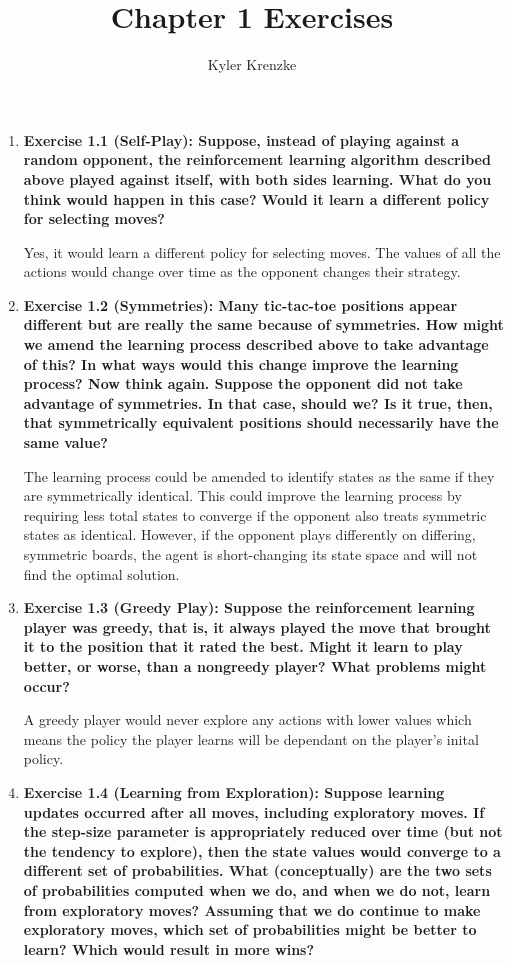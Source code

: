 \documentclass{article}
\title{Chapter 1 Exercises}
\author{Kyler Krenzke}
\date{}
\begin{document}
	
	\maketitle
	
	\begin{enumerate}

		\item \textbf{Exercise 1.1 (Self-Play): Suppose, instead of playing against a random opponent, the reinforcement learning algorithm described above played against itself,
		with both sides learning. What do you think would happen in this case? Would it learn a different policy for selecting moves?}
		
		Yes, it would learn a different policy for selecting moves. The values of all the actions would change over time as
		the opponent changes their strategy.

		\item \textbf{Exercise 1.2 (Symmetries): Many tic-tac-toe positions appear different but are really the same because of symmetries. How might we amend the learning process
		described above to take advantage of this? In what ways would this change improve the learning process? Now think again. Suppose the opponent did not take advantage of
		symmetries. In that case, should we? Is it true, then, that symmetrically equivalent positions should necessarily have the same value?}
		
		The learning process could be amended to identify states as the same if they are symmetrically identical. This could improve the learning process by requiring less total
		states to converge if the opponent also treats symmetric states as identical. However, if the opponent plays differently on differing, symmetric boards, the agent is
		short-changing its state space and will not find the optimal solution.

		\item \textbf{Exercise 1.3 (Greedy Play): Suppose the reinforcement learning player was greedy, that is, it always played the move that brought it to the position that it
		rated the best. Might it learn to play better, or worse, than a nongreedy player? What problems might occur?}
		
		A greedy player would never explore any actions with lower values which means the policy the player learns will be
		dependant on the player's inital policy. 

		\item \textbf{Exercise 1.4 (Learning from Exploration): Suppose learning updates occurred after all moves, including exploratory moves. If the step-size parameter is
		appropriately reduced over time (but not the tendency to explore), then the state values would converge to a different set of probabilities. What (conceptually) are the
		two sets of probabilities computed when we do, and when we do not, learn from exploratory moves? Assuming that we do continue to make exploratory moves, which set of
		probabilities might be better to learn? Which would result in more wins?}
		

\end{enumerate}
\end{document}
